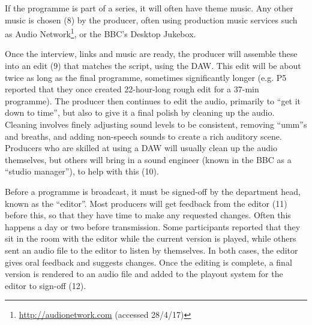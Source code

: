 If the programme is part of a series, it will often have theme music. Any other music is chosen (8) by the producer,
often using production music services such as Audio Network\footnote{\url{http://audionetwork.com} (accessed 28/4/17)},
or the BBC's Desktop Jukebox.

Once the interview, links and music are ready, the producer will assemble these into an edit (9) that matches the
script, using the DAW. This edit will be about twice as long as the final programme, sometimes significantly longer
(e.g. P5 reported that they once created 22-hour-long rough edit for a 37-min programme). The producer then continues
to edit the audio, primarily to ``get it down to time'', but also to give it a final polish by cleaning up the audio.
Cleaning involves finely adjusting sound levels to be consistent, removing ``umm''s and breaths, and adding non-speech
sounds to create a rich auditory scene.  Producers who are skilled at using a DAW will usually clean up the audio
themselves, but others will bring in a sound engineer (known in the BBC as a ``studio manager''), to help with this (10).

Before a programme is broadcast, it must be signed-off by the department head, known as the ``editor''. Most producers
will get feedback from the editor (11) before this, so that they have time to make any requested changes. Often this
happens a day or two before transmission. Some participants reported that they sit in the room with the editor while
the current version is played, while others sent an audio file to the editor to listen by themselves. In both cases,
the editor gives oral feedback and suggests changes.  Once the editing is complete, a final version is rendered to an
audio file and added to the playout system for the editor to sign-off (12).



